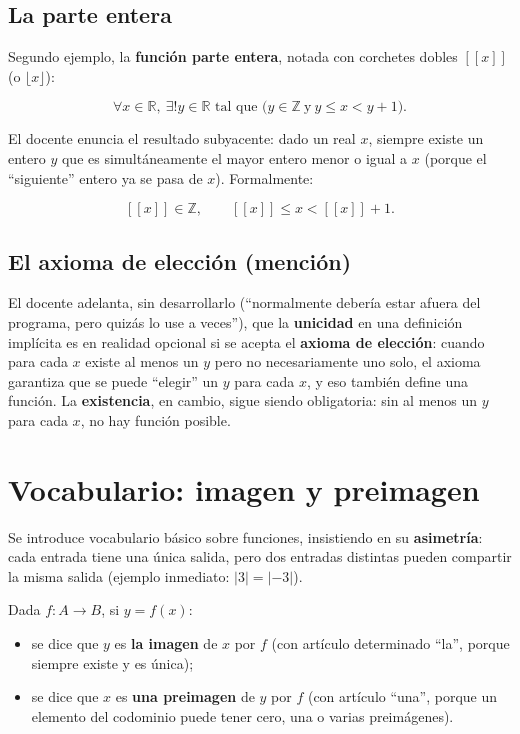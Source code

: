 \documentclass[12pt,a4paper]{article}
\begin{document}
\subsection{La parte entera}

Segundo ejemplo, la \textbf{función parte entera}, notada con corchetes dobles $[\![x]\!]$ (o $\lfloor x \rfloor$):

$$\forall x \in \mathbb{R},\ \exists! y \in \mathbb{R} \text{ tal que } \big(y \in \mathbb{Z}\ \text{y}\ y \leq x < y+1\big).$$

El docente enuncia el resultado subyacente: dado un real $x$, siempre existe un entero $y$ que es simultáneamente el mayor entero menor o igual a $x$ (porque el ``siguiente'' entero ya se pasa de $x$). Formalmente:

\begin{keybox}
$$\boxed{[\![x]\!] \in \mathbb{Z}, \qquad [\![x]\!] \leq x < [\![x]\!] + 1.}$$
\end{keybox}

\subsection{El axioma de elección (mención)}

El docente adelanta, sin desarrollarlo (``normalmente debería estar afuera del programa, pero quizás lo use a veces''), que la \textbf{unicidad} en una definición implícita es en realidad opcional si se acepta el \textbf{axioma de elección}: cuando para cada $x$ existe al menos un $y$ pero no necesariamente uno solo, el axioma garantiza que se puede ``elegir'' un $y$ para cada $x$, y eso también define una función. La \textbf{existencia}, en cambio, sigue siendo obligatoria: sin al menos un $y$ para cada $x$, no hay función posible.

\section{Vocabulario: imagen y preimagen}

Se introduce vocabulario básico sobre funciones, insistiendo en su \textbf{asimetría}: cada entrada tiene una única salida, pero dos entradas distintas pueden compartir la misma salida (ejemplo inmediato: $|3| = |-3|$).

Dada $f:A\to B$, si $y = f(x)$:

\begin{itemize}
  \item se dice que $y$ es \textbf{la imagen} de $x$ por $f$ (con artículo determinado ``la'', porque siempre existe y es única);
  \item se dice que $x$ es \textbf{una preimagen} de $y$ por $f$ (con artículo ``una'', porque un elemento del codominio puede tener cero, una o varias preimágenes).
\end{itemize}
\end{document}
